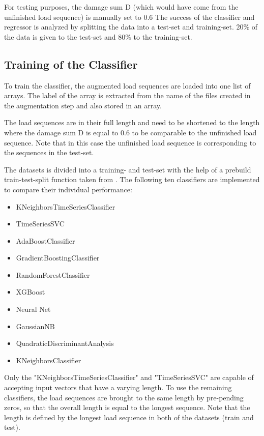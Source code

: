 For testing purposes, the damage sum D (which would have come from the unfinished load sequence) is manually set to 0.6
The success of the classifier and regressor is analyzed by splitting the data into a test-set and training-set. 
20\% of the data is given to the test-set and 80\% to the training-set.



\subsection{Training of the Classifier}
To train the classifier, the augmented  load sequences are loaded into one list of arrays. The label of the array is extracted from the name of the files created in the augmentation step and also stored in an array. 

The load sequences are in their full length and need to be shortened to the length where the damage sum D is equal to 0.6 to be comparable to the unfinished load sequence. Note that in this case the unfinished load sequence is corresponding to the sequences in the test-set. 


The datasets is divided into a training- and test-set with the help of a prebuild train-test-split function taken from \cite{SKlearn}. The following ten classifiers are implemented to compare their individual performance:

\begin{itemize} 
	\itemsep-0.5em 
	\item KNeighborsTimeSeriesClassifier \cite{tslearn}
	\item TimeSeriesSVC \cite{tslearn}
	\item AdaBoostClassifier \cite{SKlearn}
	\item GradientBoostingClassifier \cite{SKlearn}
	\item RandomForestClassifier \cite{SKlearn}
	\item XGBoost\cite{XG}
	\item Neural Net \cite{SKlearn}
	\item GaussianNB \cite{SKlearn}
	\item QuadraticDiscriminantAnalysis \cite{SKlearn}
	\item KNeighborsClassifier \cite{SKlearn}
\end{itemize}

Only the "KNeighborsTimeSeriesClassifier" and "TimeSeriesSVC" are capable of accepting input vectors that have a varying length. To use the remaining classifiers, the load sequences are brought to the same length by pre-pending zeros, so that the overall length is equal to the longest sequence. Note that the length is defined by the longest load sequence in both of the datasets (train and test).


